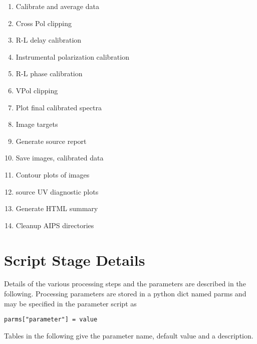 \documentclass[11pt]{article}
\begin{document}
\begin{enumerate}
\begin{enumerate}
\end{enumerate}
\item Calibrate and average data
\item Cross Pol clipping
\item R-L  delay calibration
\item Instrumental polarization calibration
\item R-L phase calibration
\item VPol clipping
\item Plot final calibrated spectra 
\item Image targets
\item Generate source report
\item Save images, calibrated data
\item Contour plots of images
\item source UV diagnostic plots
\item Generate HTML summary
\item Cleanup AIPS directories
\end{enumerate}

\section{Script Stage Details}\label{Details}
Details of the various processing steps and the parameters are
described in the following.
Processing parameters are stored in a python dict named parms and may
be specified in the parameter script as
\begin{verbatim}
parms["parameter"] = value
\end{verbatim}
Tables in the following give the parameter name, default value and a
description.
\end{document}
